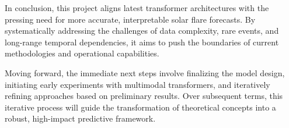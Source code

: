 In conclusion, this project aligns latest transformer architectures with the pressing need for more accurate, interpretable solar flare forecasts. By systematically addressing the challenges of data complexity, rare events, and long-range temporal dependencies, it aims to push the boundaries of current methodologies and operational capabilities.

Moving forward, the immediate next steps involve finalizing the model design, initiating early experiments with multimodal transformers, and iteratively refining approaches based on preliminary results. Over subsequent terms, this iterative process will guide the transformation of theoretical concepts into a robust, high-impact predictive framework.
